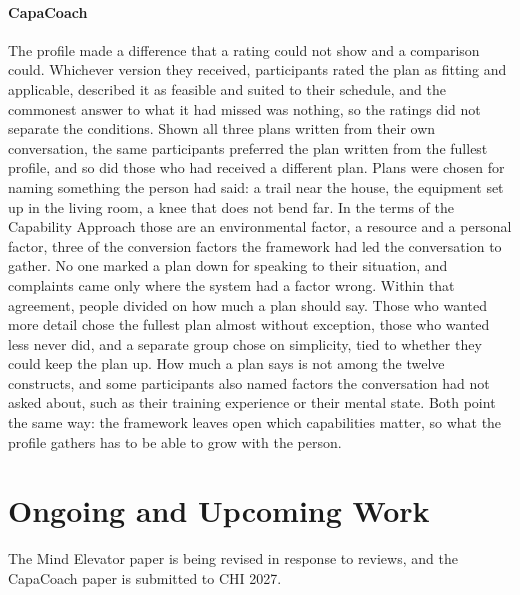 \documentclass[manuscript,screen,review]{acmart}
\begin{document}
\paragraph{CapaCoach} The profile made a difference that a rating could not show and a comparison could. Whichever version they received, participants rated the plan as fitting and applicable, described it as feasible and suited to their schedule, and the commonest answer to what it had missed was nothing, so the ratings did not separate the conditions. Shown all three plans written from their own conversation, the same participants preferred the plan written from the fullest profile, and so did those who had received a different plan. Plans were chosen for naming something the person had said: a trail near the house, the equipment set up in the living room, a knee that does not bend far. In the terms of the Capability Approach those are an environmental factor, a resource and a personal factor, three of the conversion factors the framework had led the conversation to gather. No one marked a plan down for speaking to their situation, and complaints came only where the system had a factor wrong. Within that agreement, people divided on how much a plan should say. Those who wanted more detail chose the fullest plan almost without exception, those who wanted less never did, and a separate group chose on simplicity, tied to whether they could keep the plan up. How much a plan says is not among the twelve constructs, and some participants also named factors the conversation had not asked about, such as their training experience or their mental state. Both point the same way: the framework leaves open which capabilities matter, so what the profile gathers has to be able to grow with the person.

\section{Ongoing and Upcoming Work}

The Mind Elevator paper is being revised in response to reviews, and the CapaCoach paper is submitted to CHI 2027.
\end{document}
